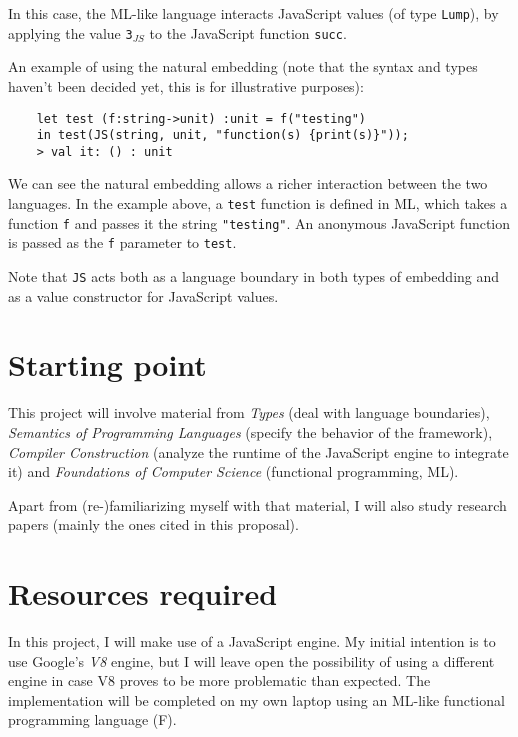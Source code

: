 \documentclass[12pt,a4paper, twoside]{article}
\newcommand{\fs}{F\nolinebreak\hspace{-.05em}\raisebox{.6ex}{\tiny\bf
    \#}}
\begin{document}
In this case, the ML-like language interacts JavaScript values (of
type \texttt{Lump}), by applying the value \texttt{3$_{JS}$} to the
JavaScript function \texttt{succ}.

An example of using the natural embedding (note that the syntax and
types haven't been decided yet, this is for illustrative purposes):

\begin{verbatim}
    let test (f:string->unit) :unit = f("testing")
    in test(JS(string, unit, "function(s) {print(s)}"));
    > val it: () : unit
\end{verbatim}

We can see the natural embedding allows a richer interaction between
the two languages. In the example above, a \texttt{test} function is
defined in ML, which takes a function \texttt{f} and passes it the
string \texttt{"testing"}. An anonymous JavaScript function is passed
as the \texttt{f} parameter to \texttt{test}.

Note that \texttt{JS} acts both as a language boundary in both types of
embedding and as a value constructor for JavaScript values.

\section{Starting point}

This project will involve material from \emph{Types} (deal with
language boundaries), \emph{Semantics of Programming Languages}
(specify the behavior of the framework), \emph{Compiler Construction}
(analyze the runtime of the JavaScript engine to integrate it) and
\emph{Foundations of Computer Science} (functional programming, ML).

Apart from (re-)familiarizing myself with that material, I will also
study research papers (mainly the ones cited in this proposal).

\section{Resources required}

In this project, I will make use of a JavaScript engine. My initial
intention is to use Google's \emph{V8} engine, but I will leave open
the possibility of using a different engine in case V8 proves to be
more problematic than expected. The implementation will be completed
on my own laptop using an ML-like functional programming language
(\fs).
\end{document}
